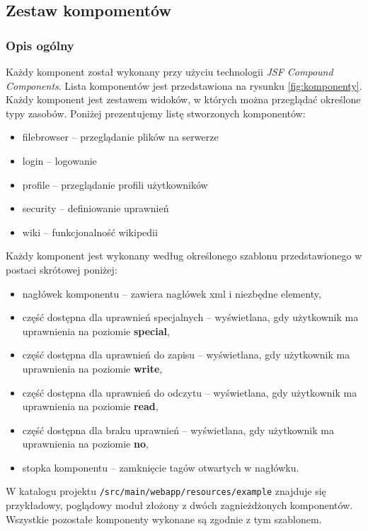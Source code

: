 \documentclass{classrep}
\begin{document}
\subsection{Zestaw kompomentów}

\subsubsection{Opis ogólny}

Każdy komponent został wykonany przy użyciu technologii \textsl{JSF Compound Components}.
Lista komponentów jest przedstawiona na rysunku \ref{fig:komponenty}.
Każdy komponent jest zestawem widoków, w których można przeglądać określone typy zasobów.
Poniżej prezentujemy listę stworzonych komponentów:
\begin{itemize}
  \item filebrowser -- przeglądanie plików na serwerze
  \item login -- logowanie
  \item profile -- przeglądanie profili użytkowników
  \item security -- definiowanie uprawnień
  \item wiki -- funkcjonalność wikipedii
\end{itemize}

Każdy komponent jest wykonany według określonego szablonu przedstawionego w postaci skrótowej poniżej:
\begin{itemize}
\item nagłówek komponentu -- zawiera nagłówek xml i niezbędne elementy,
\item część dostępna dla uprawnień specjalnych -- wyświetlana, gdy użytkownik ma uprawnienia na poziomie \textbf{special},
\item część dostępna dla uprawnień do zapisu -- wyświetlana, gdy użytkownik ma uprawnienia na poziomie \textbf{write},
\item część dostępna dla uprawnień do odczytu -- wyświetlana, gdy użytkownik ma uprawnienia na poziomie \textbf{read},
\item część dostępna dla braku uprawnień -- wyświetlana, gdy użytkownik ma uprawnienia na poziomie \textbf{no},
\item stopka komponentu -- zamknięcie tagów otwartych w nagłówku.
\end{itemize}
W katalogu projektu \texttt{/src/main/webapp/resources/example} znajduje się przykładowy, poglądowy moduł złożony z dwóch zagnieżdżonych komponentów. Wszystkie pozostałe komponenty
wykonane są zgodnie z tym szablonem.
\end{document}

